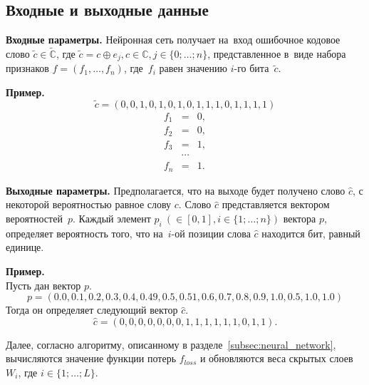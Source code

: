 \subsection{Входные и выходные данные}\label{subsec:input_output}

\textbf{Входные параметры.} Нейронная сеть получает на~вход ошибочное кодовое слово $\widetilde{c} \in \widetilde{\mathbb{C}}$,
где $\widetilde{c} = c \oplus e_j, c \in \mathbb{C}, j \in \{0;\dots; n\}$,
представленное в~виде набора признаков $f = (f_1, \dots, f_n)$, где~$f_i$ равен значению $i$-го бита~$\widetilde{c}$.

\textbf{Пример.}
\begin{equation}
    \nonumber\widetilde{c} = (0, 0, 1, 0, 1, 0, 1, 0, 1, 1, 1, 0, 1, 1, 1, 1)
\end{equation}
\begin{eqnarray}
    \nonumber f_1 &=& 0, \\
    \nonumber f_2 &=& 0, \\
    \nonumber f_3 &=& 1, \\
    \nonumber &\cdots& \\
    \nonumber f_{n} &=& 1.
\end{eqnarray}

\textbf{Выходные параметры.} Предполагается, что на выходе будет получено слово $\hat{c}$, с некоторой вероятностью равное слову $c$.
Слово $\hat{c}$ представляется вектором вероятностей~$p$. Каждый элемент $p_i~(\in [0, 1], i \in \{1;\dots; n\})$ вектора $p$, определяет вероятность того, что на~$i$-ой позиции слова $\hat{c}$ находится бит, равный единице.

\textbf{Пример.} \\
Пусть дан вектор $p$.
$$p = (0.0, 0.1, 0.2, 0.3, 0.4, 0.49, 0.5, 0.51, 0.6, 0.7, 0.8, 0.9, 1.0, 0.5, 1.0, 1.0)$$
Тогда он определяет следующий вектор $\hat{c}$.
$$\hat{c} = (0, 0, 0, 0, 0, 0, 0, 1, 1, 1, 1, 1, 1, 0, 1, 1).$$

Далее, согласно алгоритму, описанному в разделе~\ref{subsec:neural_network}, вычисляются значение функции потерь $f_{loss}$
и обновляются веса скрытых слоев $W_i$, где $i\in\{1;\dots; L\}$.
